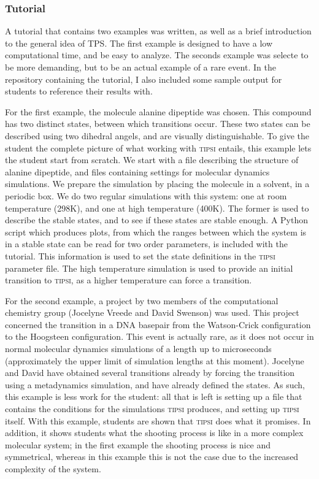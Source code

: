 \documentclass[]{article}
\begin{document}
\subsubsection*{Tutorial}

A tutorial that contains two examples was written, as well as a brief introduction to the general idea of TPS. The first example is designed to have a low computational time, and be easy to analyze. The seconds example was selecte to be more demanding, but to be an actual example of a rare event. In the repository containing the tutorial, I also included some sample output for students to reference their results with.

For the first example, the molecule alanine dipeptide was chosen. This compound has two distinct states, between which transitions occur. These two states can be described using two dihedral angels, and are visually distinguishable. To give the student the complete picture of what working with \textsc{tipsi} entails, this example lets the student start from scratch. We start with a file describing the structure of alanine dipeptide, and files containing settings for molecular dynamics simulations. We prepare the simulation by placing the molecule in a solvent, in a periodic box. We do two regular simulations with this system: one at room temperature (298K), and one at high temperature (400K). The former is used to describe the stable states, and to see if these states are stable enough. A Python script which produces plots, from which the ranges between which the system is in a stable state can be read for two order parameters, is included with the tutorial. This information is used to set the state definitions in the \textsc{tipsi} parameter file. The high temperature simulation is used to provide an initial transition to \textsc{tipsi}, as a higher temperature can force a transition.

For the second example, a project by two members of the computational chemistry group (Jocelyne Vreede and David Swenson) was used. This project concerned the transition in a DNA basepair from the Watson-Crick configuration to the Hoogsteen configuration. This event is actually rare, as it does not occur in normal molecular dynamics simulations of a length up to microseconds (approximately the upper limit of simulation lengths at this moment). Jocelyne and David have obtained several transitions already by forcing the transition using a metadynamics simulation, and have already defined the states. As such, this example is less work for the student: all that is left is setting up a file that contains the conditions for the simulations \textsc{tipsi} produces, and setting up \textsc{tipsi} itself. With this example, students are shown that \textsc{tipsi} does what it promises. In addition, it shows students what the shooting process is like in a more complex molecular system; in the first example the shooting process is nice and symmetrical, whereas in this example this is not the case due to the increased complexity of the system.
\end{document}
